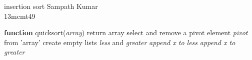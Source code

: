 \documentclass[12pt,a4paper] {beamer}
\begin{document}
\begin{frame}{insertion sort}
Sampath Kumar\\
13mcmt49
\end{frame}
\begin{frame}
\begin{algorithmic}
\STATE \textbf{function} quicksort(\emph{array})
\STATE return array 
\ENDIF
\STATE select and remove a pivot element \emph{pivot} from 'array'
\STATE create empty lists \emph{less} and \emph{greater}
\STATE \emph{append x to less}
\ELSE
\STATE \emph{append x to greater}
\ENDIF
\ENDFOR
{}
\end{algorithmic}
\end{frame}
\begin{frame}
 
\end{frame}
\end{document}
